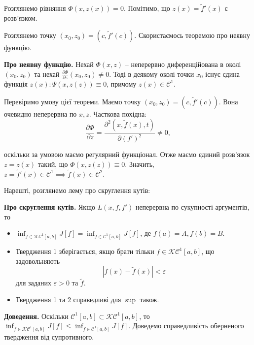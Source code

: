 \documentclass[14pt]{extarticle}
\newcommand{\<}{\langle}
\renewcommand{\>}{\rangle}
\theoremstyle{mystyle}{\newtheorem{definition}{Definition}[section]}
\theoremstyle{mystyle}{\newtheorem{proposition}[definition]{Proposition}}
\theoremstyle{mystyle}{\newtheorem{theorem}[definition]{Theorem}}
\theoremstyle{mystyle}{\newtheorem{lemma}[definition]{Lemma}}
\theoremstyle{mystyle}{\newtheorem{corollary}[definition]{Corollary}}
\theoremstyle{mystyle}{\newtheorem*{remark}{Remark}}
\theoremstyle{mystyle}{\newtheorem*{remarks}{Remarks}}
\theoremstyle{mystyle}{\newtheorem*{example}{Example}}
\theoremstyle{mystyle}{\newtheorem*{examples}{Examples}}
\theoremstyle{definition}{\newtheorem*{exercise}{Exercise}}
\theoremstyle{cstyle}{\newtheorem*{cthm}{}}
\theoremstyle{warn}
\begin{document}
Розглянемо рівняння $\Phi(x,z(x))=0$. Помітимо, що $z(x)=\widetilde{f}'(x)$ є розв'язком.

Розглянемо точку $(x_0,z_0)=(c,\widetilde{f}'(c))$. Скористаємось теоремою про неявну функцію.

\begin{theorem}
    \textbf{Про неявну функцію.} Нехай $\Phi(x,z)$ -- неперервно диференційована в околі $(x_0,z_0)$ та нехай $\frac{\partial\Phi}{\partial z}(x_0,z_0) \neq 0$. Тоді в деякому околі 
    точки $x_0$ існує єдина функція $z(x): \Psi(x,z(z)) \equiv 0$, причому $z(x) \in \mathcal{C}^1$.
\end{theorem}

Перевіримо умову цієї теореми. Маємо точку $(x_0,z_0)=(c,\widetilde{f}'(c))$. Вона очевидно неперервна по $x,z$. Часткова похідна:
\begin{equation}
    \frac{\partial\Phi}{\partial z} = \frac{\partial^2(x,\widetilde{f}(x),t)}{\partial (f')^2} \neq 0,
\end{equation}

оскільки за умовою маємо регулярний функціонал. Отже маємо єдиний розв'язок $z=z(x)$ такий, що $\Phi(x,z(z)) \equiv 0$. Значить, $z=\widetilde{f}'(x) \in \mathcal{C}^1 \implies \widetilde{f}(x) \in \mathcal{C}^2$.

Нарешті, розглянемо лему про скруглення кутів:
\begin{lemma}
    \textbf{Про скруглення кутів.} Якщо $L(x,f,f')$ неперервна по сукупності аргументів, то
    \begin{itemize}
        \item $\inf_{f \in \mathcal{KC}^1[a,b]}J[f] = \inf_{f \in \mathcal{C}^1[a,b]}J[f]$, де $f(a)=A,f(b)=B$.
        \item Твердження 1 зберігається, якщо брати тільки $f \in \mathcal{KC}^1[a,b]$, що задовольняють
        \begin{equation}
            |f(x)-\widetilde{f}(x)| < \varepsilon
        \end{equation}
        для заданих $\varepsilon>0$ та $\widetilde{f}$.
        \item Твердження 1 та 2 справедливі для $\sup$ також.
    \end{itemize}
\end{lemma}

\textbf{Доведення.} Оскільки $\mathcal{C}^1[a,b] \subset \mathcal{KC}^1[a,b]$, то $\inf_{f \in \mathcal{KC}^1[a,b]} J[f] \leq \inf_{f \in \mathcal{C}^1[a,b]}J[f]$. Доведемо справедливість оберненого твердження від супротивного. 
\end{document}
